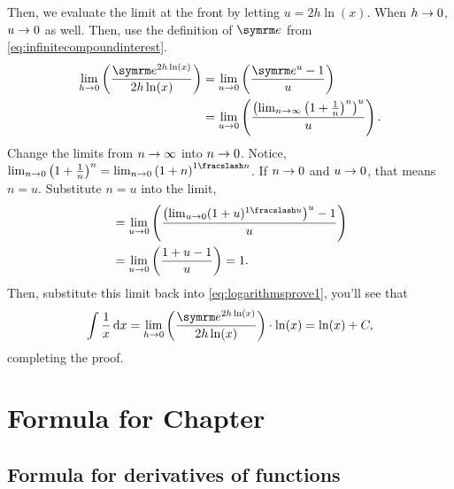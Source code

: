 Then, we evaluate the limit at the front by letting $u = 2h\ln(x)$. When $h \rightarrow 0$, $u \rightarrow 0$ as well. Then, use the definition of $\e$ from \cref{eq:infinitecompoundinterest}.
\begin{align*}
    \lim_{h \appr 0}\left(\frac{\e^{2h\ln(x)}}{2h\ln(x)}\right) &= \lim_{u \appr 0}\left(\frac{\e^u - 1}{u}\right) \\
    &= \lim_{u \appr 0}\left(\frac{\left(\lim_{n \appr \infty}\left(1 + \frac{1}{n}\right)^n\right)^u}{u}\right).
\end{align*}
Change the limits from $n \rightarrow \infty$ into $n \rightarrow 0$. Notice, $\lim_{n \appr 0}\left(1 + \frac{1}{n}\right)^n = \lim_{n \appr 0}\left(1 + n\right)^{\flatfrac{1}{n}}$. If $n \rightarrow 0$ and $u \rightarrow 0$, that means $n = u$. Substitute $n = u$ into the limit,
\begin{align*}
    &= \lim_{u \appr 0}\left(\frac{\left(\lim_{u \appr 0}(1 + u)^{\flatfrac{1}{u}}\right)^u - 1}{u}\right) \\
    &= \lim_{u \appr 0}\left(\frac{1 + u - 1}{u}\right) = 1.
\end{align*}
Then, substitute this limit back into \cref{eq:logarithmsprove1}, you'll see that
\begin{equation*}
    \int\frac{1}{x}\odif{x} = \lim_{h \appr 0}\left(\frac{\e^{2h\ln(x)}}{2h\ln(x)}\right) \cdot \ln(x) = \ln(x) + C,
\end{equation*}
completing the proof.

\section{Formula for Chapter \thechapter}

\everymath{\displaystyle}
\subsection{Formula for derivatives of functions}

